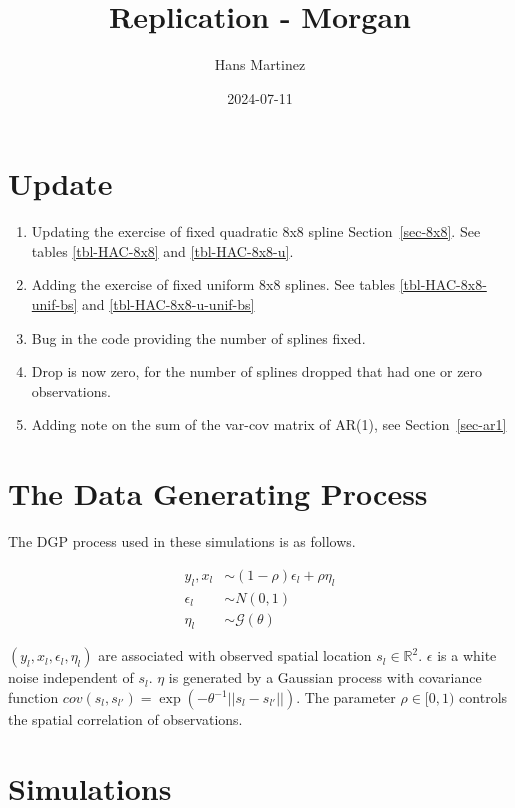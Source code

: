 \documentclass[
]{article}
\title{Replication - Morgan}
\author{Hans Martinez}
\date{2024-07-11}
\providecommand{\tightlist}{%
  \setlength{\itemsep}{0pt}\setlength{\parskip}{0pt}}\usepackage{longtable,booktabs,array}
\begin{document}
\maketitle

\section*{Update}\label{update}

\begin{enumerate}
\def\labelenumi{\arabic{enumi}.}
\tightlist
\item
  Updating the exercise of fixed quadratic 8x8 spline
  Section~\ref{sec-8x8}. See tables \ref{tbl-HAC-8x8} and
  \ref{tbl-HAC-8x8-u}.
\item
  Adding the exercise of fixed uniform 8x8 splines. See tables
  \ref{tbl-HAC-8x8-unif-bs} and \ref{tbl-HAC-8x8-u-unif-bs}
\item
  Bug in the code providing the number of splines fixed.
\item
  Drop is now zero, for the number of splines dropped that had one or
  zero observations.
\item
  Adding note on the sum of the var-cov matrix of AR(1), see
  Section~\ref{sec-ar1}
\end{enumerate}

\section{The Data Generating Process}\label{the-data-generating-process}

The DGP process used in these simulations is as follows.

\[
\begin{aligned}
    y_l, x_l &\sim (1-\rho)\epsilon_l +\rho \eta_l \\
    \epsilon_l &\sim N(0,1) \\
    \eta_l &\sim \mathcal{G}(\theta)
\end{aligned}
\]

\((y_l,x_l,\epsilon_l,\eta_l)\) are associated with observed spatial
location \(s_l \in \mathbb{R}^2\). \(\epsilon\) is a white noise
independent of \(s_l\). \(\eta\) is generated by a Gaussian process with
covariance function
\(cov(s_l,s_{l'})=\exp(-\theta^{-1}||s_l-s_{l'}||)\). The parameter
\(\rho\in[0,1)\) controls the spatial correlation of observations.

\section{Simulations}\label{simulations}
\end{document}
